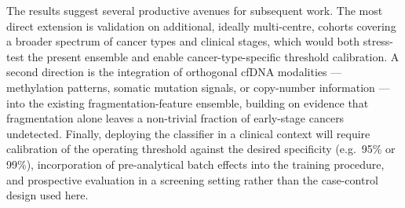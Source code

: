 The results suggest several productive avenues for subsequent work. The most
direct extension is validation on additional, ideally multi-centre, cohorts
covering a broader spectrum of cancer types and clinical stages, which would
both stress-test the present ensemble and enable cancer-type-specific
threshold calibration. A second direction is the integration of orthogonal
cfDNA modalities --- methylation patterns, somatic mutation signals, or
copy-number information --- into the existing fragmentation-feature
ensemble, building on evidence that fragmentation alone leaves a non-trivial
fraction of early-stage cancers undetected. Finally, deploying the
classifier in a clinical context will require calibration of the operating
threshold against the desired specificity (e.g.\ 95\% or 99\%), incorporation
of pre-analytical batch effects into the training procedure, and
prospective evaluation in a screening setting rather than the
case-control design used here.
